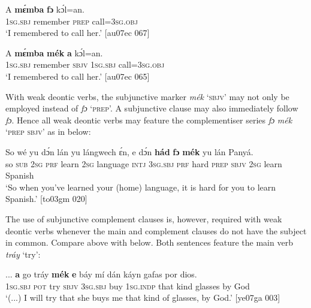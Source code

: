 \ea%
    \label{ex:key:1390}
    \gll A    \textbf{mɛ́mba}    \textbf{fɔ}  kɔ́l=an.\\
\textsc{1sg.sbj}  remember  \textsc{prep}  call=\textsc{3sg.obj}\\

\glt ‘I remembered to call her.’ [au07ec 067]
\z


\ea%
    \label{ex:key:1391}
    \gll A    \textbf{mɛ́mba}    \textbf{mék}    \textbf{a}    kɔ́l=an.\\
\textsc{1sg.sbj}  remember  \textsc{sbjv}    \textsc{1sg.sbj}  call=\textsc{3sg.obj}\\

\glt ‘I remembered to call her.’ [au07ec 065]
\z

With weak deontic verbs, the subjunctive marker \textit{mék} ‘\textsc{sbjv}’ may not only be employed instead of \textit{fɔ} ‘\textsc{prep}’. A subjunctive clause may also immediately follow \textit{fɔ}. Hence all weak deontic verbs may feature the complementiser series \textit{fɔ} \textit{mék} ‘\textsc{prep} \textsc{sbjv}’ as in  below:


\ea%
    \label{ex:key:1392}
    \gll So  wé  yu  dɔ́n    lán    yu  lángwech  ɛ́n,  e    dɔ́n  \textbf{hád}
\textbf{fɔ}  \textbf{mék}   yu  lán    Panyá.\\
so  \textsc{sub}  \textsc{2sg}  \textsc{prf}    learn  \textsc{2sg}  language    \textsc{intj}  \textsc{3sg.sbj}  \textsc{prf}  hard
\textsc{prep}  \textsc{sbjv}    \textsc{2sg}  learn  Spanish\\

\glt ‘So when you’ve learned your (home) language, it is hard for you to learn 
Spanish.’ [to03gm 020]
\z

The use of subjunctive complement clauses is, however, required with weak deontic verbs whenever the main and complement clauses do not have the subject in common. Compare  above with  below. Both sentences feature the main verb \textit{tráy} ‘try’:


\ea%
    \label{ex:key:1393}
    \gll \op...\cp{}  \textbf{a}   go  tráy    \textbf{mék}   \textbf{e}    báy mí    dán    káyn
gafas  por  dios.\\
{}  \textsc{1sg.sbj}  \textsc{pot}  try    \textsc{sbjv}    \textsc{3sg.sbj}  buy  \textsc{1sg.indp}  that    kind
glasses  by  God\\

\glt ‘(...) I will try that she buys me that kind of glasses, by God.’ [ye07ga 003]
\z

